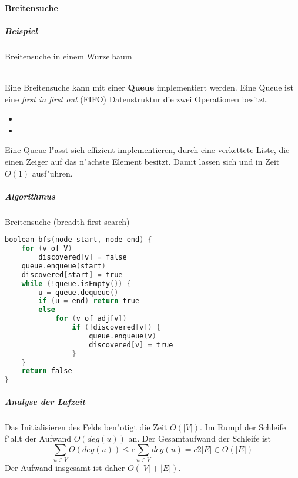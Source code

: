 \paragraph{Breitensuche}
\subparagraph{Beispiel} Breitensuche in einem Wurzelbaum\\
\\ %
Eine Breitensuche kann mit einer \textbf{Queue} implementiert werden. Eine Queue ist eine
\textit{first in first out} (FIFO) Datenstruktur die zwei Operationen besitzt.
\begin{itemize}
    \item {}
    \item {}
\end{itemize}
Eine Queue l"asst sich effizient implementieren, durch eine verkettete Liste, die einen Zeiger auf das n"achste
Element besitzt. Damit lassen sich  und  in Zeit $O(1)$ ausf"uhren.

\subparagraph{Algorithmus} Breitensuche (breadth first search)
\begin{lstlisting}[language=C]
boolean bfs(node start, node end) {
    for (v of V)
        discovered[v] = false
    queue.enqueue(start)
    discovered[start] = true
    while (!queue.isEmpty()) {
        u = queue.dequeue()
        if (u = end) return true
        else
            for (v of adj[v])
                if (!discovered[v]) {
                    queue.enqueue(v)
                    discovered[v] = true
                }
    }
    return false
}
\end{lstlisting}

\subparagraph{Analyse der Lafzeit} \parskp
Das Initialisieren des Felds  ben"otigt die Zeit $O(|V|)$. Im Rumpf der  Schleife
f"allt der Aufwand $O(deg(u))$ an. Der Gesamtaufwand der  Schleife ist
\[
    \sum_{u\in V}O(deg(u))\le c\sum_{u\in V}deg(u)=c2|E|\in O(|E|)    
\]
Der Aufwand insgesamt ist daher $O(|V|+|E|)$.

